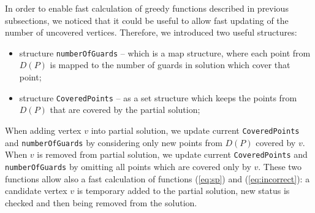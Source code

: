 \documentclass[runningheads,a4paper]{elsarticle}
\begin{document}
	In order to enable fast calculation of greedy functions described in previous subsections, we noticed that it could be useful to allow fast updating of the number of uncovered vertices. Therefore, we introduced two useful structures: %
	\begin{itemize}
		\item structure \texttt{numberOfGuards} -- which is a map structure, where each point from $D(P)$ is mapped to the number of guards in solution which cover that point;
		\item structure \texttt{CoveredPoints} -- as a set structure which keeps the points from $D(P)$ that are covered by the partial solution;
	\end{itemize}
  When adding vertex $v$ into partial solution, we update current \texttt{CoveredPoints} and \texttt{numberOfGuards} by considering only new points from $D(P)$ covered by $v$.
  When $v$ is removed from partial solution, we update current \texttt{CoveredPoints} and \texttt{numberOfGuards} by omitting all points which are covered only by $v$.  These two functions allow also a fast calculation of  functions (\ref{eq:sp}) and  (\ref{eq:incorrect}): a candidate vertex $v$ is temporary added to the partial solution, new status is checked and then being removed from the solution.


\end{document}
